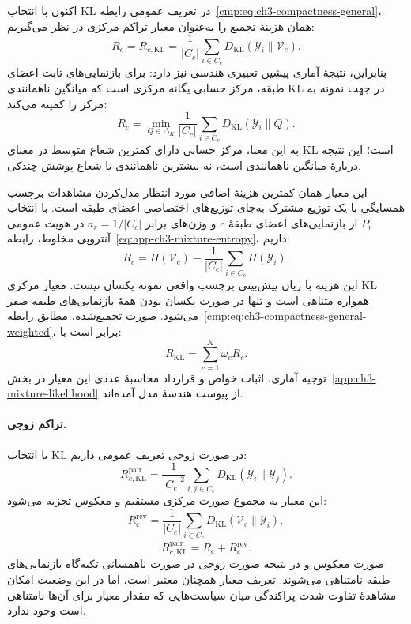 اکنون با انتخاب KL در تعریف عمومی
رابطه~\eqref{cmp:eq:ch3-compactness-general}، همان هزینهٔ
تجمیع را به‌عنوان معیار تراکم مرکزی در نظر می‌گیریم:
\begin{equation}\label{cmp:eq:ch3-R-class}
R_c=R_{c,\mathrm{KL}}
=\frac1{|C_c|}\sum_{i\in C_c}
D_{\mathrm{KL}}(\mathscr Y_i\|\mathcal V_c).
\end{equation}
بنابراین، نتیجهٔ آماری پیشین تعبیری هندسی نیز دارد:
برای بازنمایی‌های ثابت اعضای طبقه، مرکز حسابی یگانه
مرکزی است که میانگین ناهمانندی KL در جهت نمونه به
مرکز را کمینه می‌کند:
\begin{equation}\label{cmp:eq:ch3-KL-min-mean-radius}
R_c=\min_{Q\in\Delta_K}\frac1{|C_c|}
\sum_{i\in C_c}D_{\mathrm{KL}}(\mathscr Y_i\|Q).
\end{equation}
به این معنا، مرکز حسابی دارای کمترین شعاع متوسط
در معنای KL است؛ این نتیجه دربارهٔ میانگین ناهمانندی
است، نه بیشترین ناهمانندی یا شعاع پوشش چندکی.

این معیار همان کمترین هزینهٔ اضافی مورد انتظار
مدل‌کردن مشاهدات برچسب همسایگی با یک توزیع مشترک
به‌جای توزیع‌های اختصاصی اعضای طبقه است.
با انتخاب $P_r$ از بازنمایی‌های اعضای طبقهٔ $c$ و
وزن‌های برابر $a_r=1/|C_c|$ در هویت عمومی آنتروپی
مخلوط، رابطه~\eqref{eq:app-ch3-mixture-entropy}،
داریم:
\begin{equation}\label{cmp:eq:ch3-R-entropy}
R_c=H(\mathcal V_c)-\frac1{|C_c|}\sum_{i\in C_c}H(\mathscr Y_i).
\end{equation}
این هزینه با زیان پیش‌بینی برچسب واقعی نمونه یکسان
نیست. معیار مرکزی KL همواره متناهی است و تنها در
صورت یکسان بودن همهٔ بازنمایی‌های طبقه صفر می‌شود.
صورت تجمیع‌شده، مطابق
رابطه~\eqref{cmp:eq:ch3-compactness-general-weighted}،
برابر است با:
\begin{equation}\label{cmp:eq:ch3-R-average}
R_{\mathrm{KL}}=\sum_{c=1}^K\omega_c R_c.
\end{equation}
توجیه آماری، اثبات خواص و قرارداد محاسبهٔ عددی این
معیار در بخش~\ref{app:ch3-mixture-likelihood} از پیوست
هندسهٔ مدل آمده‌اند.

\paragraph{تراکم زوجی.}
با انتخاب KL در صورت زوجی تعریف عمومی داریم:
\begin{equation}\label{cmp:eq:ch3-KL-pair}
R_{c,\mathrm{KL}}^{\mathrm{pair}}
=\frac1{|C_c|^2}\sum_{i,j\in C_c}
D_{\mathrm{KL}}(\mathscr Y_i\|\mathscr Y_j).
\end{equation}
این معیار به مجموع صورت مرکزی مستقیم و معکوس
تجزیه می‌شود:
\begin{equation}\label{cmp:eq:ch3-KL-reverse}
R_c^{\mathrm{rev}}=\frac1{|C_c|}\sum_{i\in C_c}
D_{\mathrm{KL}}(\mathcal V_c\|\mathscr Y_i),
\end{equation}
\begin{equation}\label{cmp:eq:ch3-KL-pair-decomposition}
R_{c,\mathrm{KL}}^{\mathrm{pair}}=R_c+R_c^{\mathrm{rev}}.
\end{equation}
صورت معکوس و در نتیجه صورت زوجی در صورت ناهمسانی
تکیه‌گاه بازنمایی‌های طبقه نامتناهی می‌شوند. تعریف
معیار همچنان معتبر است، اما در این وضعیت امکان
مشاهدهٔ تفاوت شدت پراکندگی میان سیاست‌هایی که
مقدار معیار برای آن‌ها نامتناهی است وجود ندارد.

